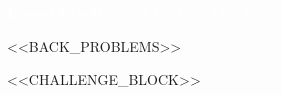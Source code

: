 \documentclass[12pt]{article}
\begin{document}
\Large

\noindent
\colorbox{headerblue}{\parbox{\dimexpr\textwidth}{%
  \vspace{3pt}
  \centering\large\textbf{\textcolor{white}{Lesson Practice}}%
  \quad\textcolor{white}{\textbar}\quad
  \textcolor{white}{\normalsize <<LESSON_TITLE>>}
  \vspace{3pt}
}}
\vspace{8pt}


<<BACK_PROBLEMS>>


<<CHALLENGE_BLOCK>>

\end{document}
